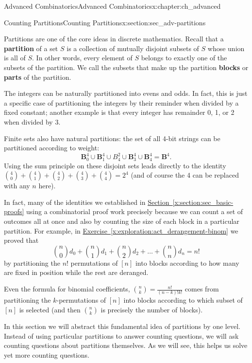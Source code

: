 \documentclass[oneside,10pt,]{book}
\newcommand{\terminology}[1]{\textbf{#1}}
\numberwithin{equation}{chapter}
\def\B{\mathbf{B}}
\begin{document}
\begin{chapterptx}{Advanced Combinatorics}{}{Advanced Combinatorics}{}{}{x:chapter:ch_advanced}
\begin{sectionptx}{Counting Partitions}{}{Counting Partitions}{}{}{x:section:sec_adv-partitions}
\begin{introduction}{}%
Partitions are one of the core ideas in discrete mathematics.  Recall that a \terminology{partition} of a set \(S\) is a collection of mutually disjoint subsets of \(S\) whose union is all of \(S\).  In other words, every element of \(S\) belongs to exactly one of the subsets of the partition.  We call the subsets that make up the partition \terminology{blocks} or \terminology{parts} of the partition.%
\par
The integers can be naturally partitioned into evens and odds.  In fact, this is just a specific case of partitioning the integers by their reminder when divided by a fixed constant; another example is that every integer has remainder 0, 1, or 2 when divided by 3.%
\par
Finite sets also have natural partitions: the set of all 4-bit strings can be partitioned according to weight:%
\begin{equation*}
\B^4_0 \cup \B^4_1 \cup B_4^2 \cup \B^4_3 \cup \B^4_4 = \B^4\text{.}
\end{equation*}
Using the sum principle on these disjoint sets leads directly to the identity \(\binom{4}{0} + \binom{4}{1} + \binom{4}{2} + \binom{4}{3} + \binom{4}{4} = 2^4\) (and of course the 4 can be replaced with any \(n\) here).%
\par
In fact, many of the identities we established in \hyperref[x:section:sec_basic-proofs]{Section~\ref{x:section:sec_basic-proofs}} using a combinatorial proof work precisely because we can count a set of outcomes all at once and also by counting the size of each block in a particular partition.  For example, in \hyperref[x:exploration:act_derangement-binom]{Exercise~\ref{x:exploration:act_derangement-binom}} we proved that%
\begin{equation*}
\binom{n}{0} d_{0} + \binom{n}{1} d_{1} + \binom{n}{2} d_{2} + \ldots + \binom{n}{n} d_{n} = n!
\end{equation*}
by partitioning the \(n!\) permutations of \([n]\) into blocks according to how many are fixed in position while the rest are deranged.%
\par
Even the formula for binomial coefficients, \(\binom{n}{k} = \frac{n!}{(n-k)!k!}\) comes from partitioning the \(k\)-permutations of \([n]\) into blocks according to which subset of \([n]\) is selected (and then \(\binom{n}{k}\) is precisely the number of blocks).%
\par
In this section we will abstract this fundamental idea of partitions by one level.  Instead of using particular partitions to answer counting questions, we will ask counting questions about partitions themselves.  As we will see, this helps us solve yet more counting questions.%

\end{introduction}
\end{sectionptx}
\end{chapterptx}
\end{document}
